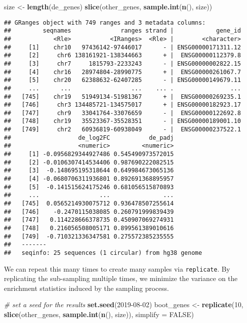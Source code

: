 \documentclass[
]{article}
\newenvironment{Shaded}{}{}
\newcommand{\CommentTok}[1]{\textcolor[rgb]{0.38,0.63,0.69}{\textit{#1}}}
\newcommand{\DataTypeTok}[1]{\textcolor[rgb]{0.56,0.13,0.00}{#1}}
\newcommand{\DecValTok}[1]{\textcolor[rgb]{0.25,0.63,0.44}{#1}}
\newcommand{\KeywordTok}[1]{\textcolor[rgb]{0.00,0.44,0.13}{\textbf{#1}}}
\newcommand{\NormalTok}[1]{#1}
\newcommand{\OtherTok}[1]{\textcolor[rgb]{0.00,0.44,0.13}{#1}}
\newcommand{\StringTok}[1]{\textcolor[rgb]{0.25,0.44,0.63}{#1}}
\begin{document}
\begin{Shaded}
\begin{Highlighting}[]
\NormalTok{size <-}\StringTok{ }\KeywordTok{length}\NormalTok{(de_genes)}
\KeywordTok{slice}\NormalTok{(other_genes, }\KeywordTok{sample.int}\NormalTok{(}\KeywordTok{n}\NormalTok{(), size))}
\end{Highlighting}
\end{Shaded}

\begin{verbatim}
## GRanges object with 749 ranges and 3 metadata columns:
##         seqnames              ranges strand |            gene_id
##            <Rle>           <IRanges>  <Rle> |        <character>
##     [1]    chr10   97436142-97446017      - | ENSG00000171311.12
##     [2]     chr6 138161921-138344663      + |  ENSG00000112379.8
##     [3]     chr7     1815793-2233243      - | ENSG00000002822.15
##     [4]    chr16   28974804-28990775      + |  ENSG00000261067.7
##     [5]    chr20   62388632-62407285      - | ENSG00000149679.11
##     ...      ...                 ...    ... .                ...
##   [745]    chr19   51949134-51981367      + |  ENSG00000269235.1
##   [746]     chr3 134485721-134575017      + | ENSG00000182923.17
##   [747]     chr9   33041764-33076659      - |  ENSG00000122692.8
##   [748]    chr19   35523367-35528351      - | ENSG00000189001.10
##   [749]     chr2   60936819-60938049      - |  ENSG00000237522.1
##                   de_log2FC           de_padj
##                   <numeric>         <numeric>
##     [1] -0.0956829344927486 0.545490973572015
##     [2] -0.0106307414534406 0.987690222082515
##     [3]  -0.148695195318644 0.649984673065136
##     [4] -0.0680706311936801 0.892691368895957
##     [5]  -0.141515624175246 0.681056515870893
##     ...                 ...               ...
##   [745]  0.0565214930075712 0.936478507255614
##   [746]    -0.2470115038085 0.260791999839439
##   [747]   0.114228666378735 0.450907069274931
##   [748]   0.216056508005171 0.899561389010616
##   [749]  -0.710321336347581 0.275572385235555
##   -------
##   seqinfo: 25 sequences (1 circular) from hg38 genome
\end{verbatim}

We can repeat this many times to create many samples via \texttt{replicate}. By
replicating the sub-sampling multiple times, we minimize the variance on the
enrichment statistics induced by the sampling process.

\begin{Shaded}
\begin{Highlighting}[]
\CommentTok{# set a seed for the results}
\KeywordTok{set.seed}\NormalTok{(}\DecValTok{2019-08-02}\NormalTok{)}
\NormalTok{boot_genes <-}\StringTok{ }\KeywordTok{replicate}\NormalTok{(}\DecValTok{10}\NormalTok{,}
                        \KeywordTok{slice}\NormalTok{(other_genes, }\KeywordTok{sample.int}\NormalTok{(}\KeywordTok{n}\NormalTok{(), size)),}
                        \DataTypeTok{simplify =} \OtherTok{FALSE}\NormalTok{)}
\end{Highlighting}
\end{Shaded}
\end{document}
